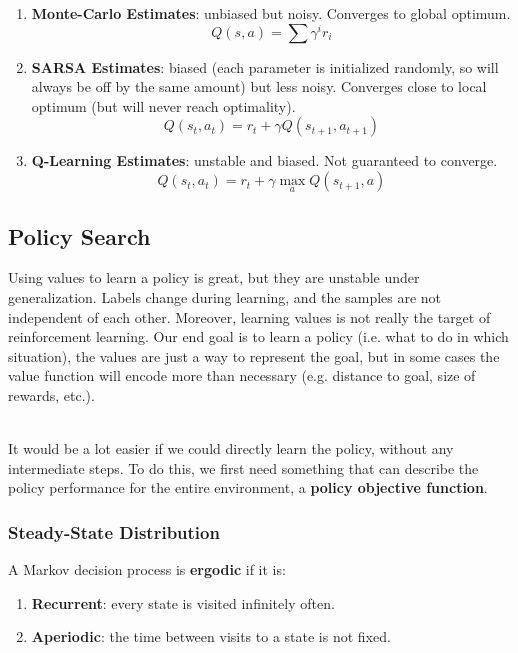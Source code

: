 \documentclass[12pt]{article}
\begin{document}
\begin{enumerate}
    \item \textbf{Monte-Carlo Estimates}: unbiased but noisy. Converges to global optimum.
    \[ Q(s, a) = \sum \gamma^i r_i \]
    \item \textbf{SARSA Estimates}: biased (each parameter is initialized randomly, so will always be off by the same amount) but less noisy. Converges close to local optimum (but will never reach optimality).
    \[ Q(s_t, a_t) = r_t + \gamma Q(s_{t + 1}, a_{t + 1}) \]
    \item \textbf{Q-Learning Estimates}: unstable and biased. Not guaranteed to converge.
    \[ Q(s_t, a_t) = r_t + \gamma \max_a Q(s_{t + 1}, a)  \]
\end{enumerate}

\subsection{Policy Search}
Using values to learn a policy is great, but they are unstable under generalization.
Labels change during learning, and the samples are not independent of each other.
Moreover, learning values is not really the target of reinforcement learning.
Our end goal is to learn a policy (i.e. what to do in which situation), the values are just a way to represent the goal, but in some cases the value function will encode more than necessary (e.g. distance to goal, size of rewards, etc.).

\noindent
\\
It would be a lot easier if we could directly learn the policy, without any intermediate steps.
To do this, we first need something that can describe the policy performance for the entire environment, a \textbf{policy objective function}.

\subsubsection{Steady-State Distribution}
A Markov decision process is \textbf{ergodic} if it is:

\begin{enumerate}
    \item \textbf{Recurrent}: every state is visited infinitely often.
    \item \textbf{Aperiodic}: the time between visits to a state is not fixed.
\end{enumerate}
\end{document}

